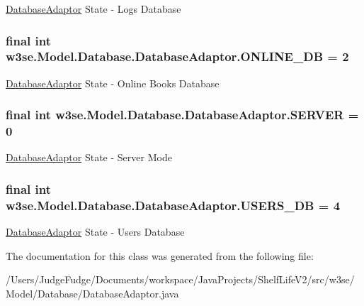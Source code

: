 \hyperlink{classw3se_1_1_model_1_1_database_1_1_database_adaptor}{Database\-Adaptor} State -\/ Logs Database \hypertarget{classw3se_1_1_model_1_1_database_1_1_database_adaptor_afe4d33dc15d4ac9af43c3c631619a086}{
\subsubsection[{O\-N\-L\-I\-N\-E\-\_\-\-D\-B}]{\setlength{\rightskip}{0pt plus 5cm}final int w3se.\-Model.\-Database.\-Database\-Adaptor.\-O\-N\-L\-I\-N\-E\-\_\-\-D\-B = 2\hspace{0.3cm}{\ttfamily [static]}}}\label{classw3se_1_1_model_1_1_database_1_1_database_adaptor_afe4d33dc15d4ac9af43c3c631619a086}
\hyperlink{classw3se_1_1_model_1_1_database_1_1_database_adaptor}{Database\-Adaptor} State -\/ Online Books Database \hypertarget{classw3se_1_1_model_1_1_database_1_1_database_adaptor_a7fad4326381f42f0e38484a0e07d7ff3}{
\subsubsection[{S\-E\-R\-V\-E\-R}]{\setlength{\rightskip}{0pt plus 5cm}final int w3se.\-Model.\-Database.\-Database\-Adaptor.\-S\-E\-R\-V\-E\-R = 0\hspace{0.3cm}{\ttfamily [static]}}}\label{classw3se_1_1_model_1_1_database_1_1_database_adaptor_a7fad4326381f42f0e38484a0e07d7ff3}
\hyperlink{classw3se_1_1_model_1_1_database_1_1_database_adaptor}{Database\-Adaptor} State -\/ Server Mode \hypertarget{classw3se_1_1_model_1_1_database_1_1_database_adaptor_a59eacb7231c850d9ac675ea99b3f4bfd}{
\subsubsection[{U\-S\-E\-R\-S\-\_\-\-D\-B}]{\setlength{\rightskip}{0pt plus 5cm}final int w3se.\-Model.\-Database.\-Database\-Adaptor.\-U\-S\-E\-R\-S\-\_\-\-D\-B = 4\hspace{0.3cm}{\ttfamily [static]}}}\label{classw3se_1_1_model_1_1_database_1_1_database_adaptor_a59eacb7231c850d9ac675ea99b3f4bfd}
\hyperlink{classw3se_1_1_model_1_1_database_1_1_database_adaptor}{Database\-Adaptor} State -\/ Users Database 

The documentation for this class was generated from the following file\-:\begin{DoxyCompactItemize}
\item 
/\-Users/\-Judge\-Fudge/\-Documents/workspace/\-Java\-Projects/\-Shelf\-Life\-V2/src/w3se/\-Model/\-Database/Database\-Adaptor.\-java\end{DoxyCompactItemize}
